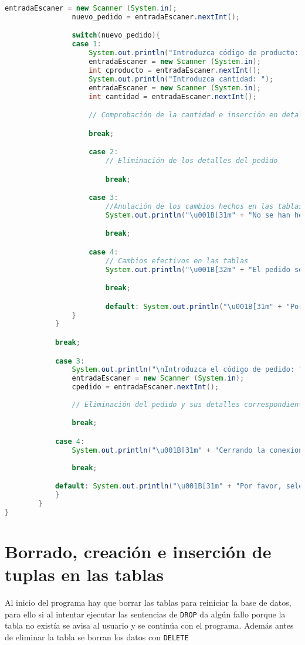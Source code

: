 \begin{lstlisting}[language=Java]
				entradaEscaner = new Scanner (System.in);
				nuevo_pedido = entradaEscaner.nextInt();

				switch(nuevo_pedido){
				case 1:
					System.out.println("Introduzca código de producto: ");
					entradaEscaner = new Scanner (System.in);
					int cproducto = entradaEscaner.nextInt();
					System.out.println("Introduzca cantidad: ");
					entradaEscaner = new Scanner (System.in);
					int cantidad = entradaEscaner.nextInt();

					// Comprobación de la cantidad e inserción en detalle pedido

					break;

					case 2:
						// Eliminación de los detalles del pedido

						break;

					case 3:
						//Anulación de los cambios hechos en las tablas
						System.out.println("\u001B[31m" + "No se han hecho efectivos los cambios" + "\u001B[0m");

						break;

					case 4:
						// Cambios efectivos en las tablas
						System.out.println("\u001B[32m" + "El pedido se ha guardado correctamente" + "\u001B[0m");

						break;

						default: System.out.println("\u001B[31m" + "Por favor, seleccione una opcion valida: " + "\u001B[0m");
				}
			}

			break;

			case 3:
				System.out.println("\nIntroduzca el código de pedido: ");
				entradaEscaner = new Scanner (System.in);
				cpedido = entradaEscaner.nextInt();
				
				// Eliminación del pedido y sus detalles correspondientes

				break;

			case 4:
				System.out.println("\u001B[31m" + "Cerrando la conexion..." + "\u001B[0m");
	
				break;

			default: System.out.println("\u001B[31m" + "Por favor, seleccione una opcion valida: " + "\u001B[0m");
			}
		}
}
\end{lstlisting}

\section{Borrado, creación e inserción de tuplas en las tablas}

Al inicio del programa hay que borrar las tablas para reiniciar la base de datos, para ello si al intentar ejecutar las sentencias de \texttt{DROP} da algún fallo porque la tabla no existía se avisa al usuario y se continúa con el programa. Además antes de eliminar la tabla se borran los datos con \texttt{DELETE}


